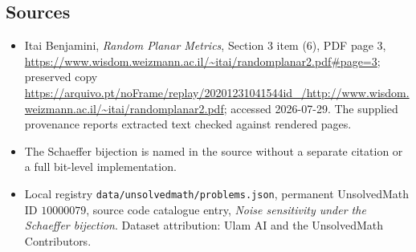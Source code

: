 \documentclass[11pt]{article}
\begin{document}
\subsection{Sources}
\begin{itemize}
\item Itai Benjamini, \emph{Random Planar Metrics}, Section 3 item (6), PDF page 3, \url{https://www.wisdom.weizmann.ac.il/~itai/randomplanar2.pdf#page=3}; preserved copy \url{https://arquivo.pt/noFrame/replay/20201231041544id_/http://www.wisdom.weizmann.ac.il/~itai/randomplanar2.pdf}; accessed 2026-07-29. The supplied provenance reports extracted text checked against rendered pages.
\item The Schaeffer bijection is named in the source without a separate citation or a full bit-level implementation.
\item Local registry \texttt{data/unsolvedmath/problems.json}, permanent UnsolvedMath ID $10000079$, source code catalogue entry, \emph{Noise sensitivity under the Schaeffer bijection}. Dataset attribution: Ulam AI and the UnsolvedMath Contributors.
\end{itemize}
\end{document}
